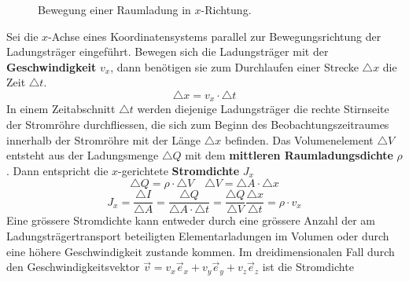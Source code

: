 \begin{figure}[H]
\centering
\caption{Bewegung einer Raumladung in $x$-Richtung.}
\label{fig_IId}
\end{figure}
\noindent Sei die $x$-Achse eines Koordinatensystems parallel zur Bewegungsrichtung der Ladungsträger eingeführt. Bewegen sich die Ladungsträger mit der \textbf{Geschwindigkeit} $v_x$, dann benötigen sie zum Durchlaufen einer Strecke $\triangle x$ die Zeit $\triangle t$.
\begin{equation}
\boxed{\triangle x=v_x\cdot \triangle t}
\end{equation}
In einem Zeitabschnitt $\triangle t$ werden diejenige Ladungsträger die rechte Stirnseite der Stromröhre durchfliessen, die sich zum Beginn des Beobachtungszeitraumes innerhalb der Stromröhre mit der Länge $\triangle x$ befinden. Das Volumenelement $\triangle V$ entsteht aus der Ladungsmenge $\triangle Q$ mit dem \textbf{mittleren Raumladungsdichte} $\rho$. Dann entspricht die $x$-gerichtete \textbf{Stromdichte} $J_x$
\begin{equation}
\boxed{\triangle Q=\rho\cdot \triangle V}\quad \boxed{\triangle V=\triangle A\cdot \triangle x}
\end{equation}
\begin{equation}
\boxed{J_x=\dfrac{\triangle I}{\triangle A}=\dfrac{\triangle Q}{\triangle A\cdot \triangle t}=\dfrac{\triangle Q}{\triangle V}\dfrac{\triangle x}{\triangle t}=\rho\cdot v_x}
\end{equation}
Eine grössere Stromdichte kann entweder durch eine grössere Anzahl der am Ladungsträgertransport beteiligten Elementarladungen im Volumen oder durch eine höhere Geschwindigkeit zustande kommen.
\newline\newline 
Im dreidimensionalen Fall durch den Geschwindigkeitsvektor $\overrightarrow{v}=v_x\overrightarrow{e}_x+v_y\overrightarrow{e}_y+v_z\overrightarrow{e}_z$ ist die Stromdichte
